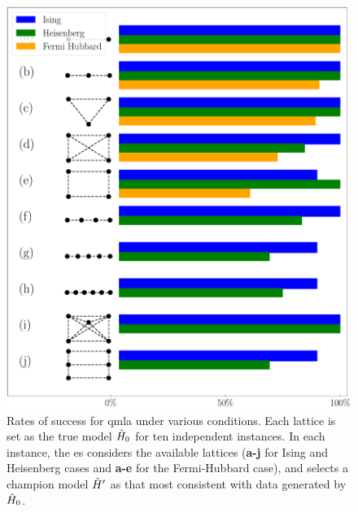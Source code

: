 
\begin{figure}
    \includegraphics[width=\textwidth]{theoretical_study/lattice_success_rates.pdf}
    \caption{
        Rates of success for \gls{qmla} under various conditions. 
        Each lattice is set as the true model $\hat{H}_0$ for ten independent instances. 
        In each instance, the \gls{es} considers the available lattices 
            (\textbf{a-j} for Ising and Heisenberg cases and \textbf{a-e} for the Fermi-Hubbard case), 
            and selects a champion model $\hat{H}^{\prime}$ as that most consistent with data generated by $\hat{H}_0$. 
    }
    \label{fig:lattice_success_rates}
\end{figure}    

